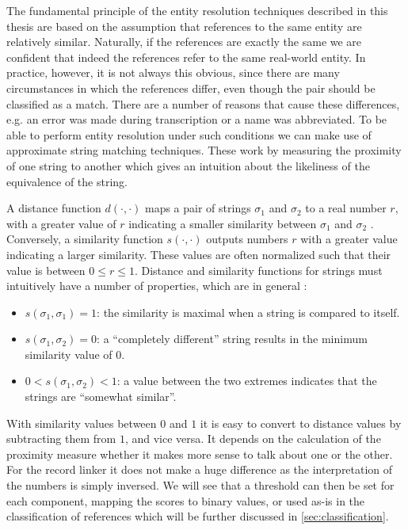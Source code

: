 The fundamental principle of the entity resolution techniques described in this thesis are based on the assumption that references to the same entity are relatively similar.
Naturally, if the references are exactly the same we are confident that indeed the references refer to the same real-world entity.
In practice, however, it is not always this obvious, since there are many circumstances in which the references differ, even though the pair should be classified as a match.
There are a number of reasons that cause these differences, e.g. an error was made during transcription or a name was abbreviated.
To be able to perform entity resolution under such conditions we can make use of approximate string matching techniques.
These work by measuring the proximity of one string to another which gives an intuition about the likeliness of the equivalence of the string.

A distance function $d(\cdot, \cdot)$ maps a pair of strings $\sigma_1$ and $\sigma_2$ to a real number $r$, with a greater value of $r$ indicating a smaller similarity between $\sigma_1$ and $\sigma_2$ \citep{Cohen2003}.
Conversely, a similarity function $s(\cdot, \cdot)$ outputs numbers $r$ with a greater value indicating a larger similarity.
These values are often normalized such that their value is between $0 \leq r \leq 1$.
Distance and similarity functions for strings must intuitively have a number of properties, which are in general \citep{Christen2012}:

\begin{itemize}
    \item $s(\sigma_1, \sigma_1)=1$: the similarity is maximal when a string is compared to itself.
    \item $s(\sigma_1, \sigma_2)=0$: a ``completely different'' string results in the minimum similarity value of $0$.
    \item $0 < s(\sigma_1, \sigma_2) < 1$: a value between the two extremes indicates that the strings are ``somewhat similar''.
\end{itemize}

With similarity values between $0$ and $1$ it is easy to convert to distance values by subtracting them from $1$, and vice versa.
It depends on the calculation of the proximity measure whether it makes more sense to talk about one or the other.
For the record linker it does not make a huge difference as the interpretation of the numbers is simply inversed.
We will see that a threshold can then be set for each component, mapping the scores to binary values, or used as-is in the classification of references which will be further discussed in \cref{sec:classification}.


